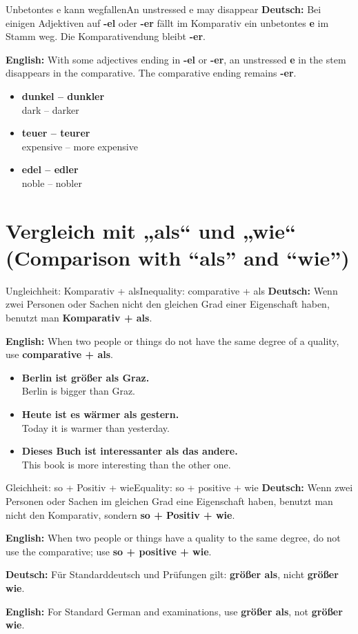\documentclass[a4paper,11pt]{article}
\newcommand{\GermanText}[1]{\textbf{Deutsch: }#1\par}
\newcommand{\EnglishText}[1]{{\small\color{SoftGray}\textbf{English: }#1\par}}
\newcommand{\ExampleItem}[2]{\item \textbf{#1}\\{\small\color{SoftGray}#2}}
\begin{document}
      \begin{grammarentry}{Unbetontes e kann wegfallen}{An unstressed e may disappear}
         \GermanText{Bei einigen Adjektiven auf \textbf{-el} oder \textbf{-er} fällt im Komparativ ein unbetontes \textbf{e} im Stamm weg. Die Komparativendung bleibt \textbf{-er}.}
         \EnglishText{With some adjectives ending in \textbf{-el} or \textbf{-er}, an unstressed \textbf{e} in the stem disappears in the comparative. The comparative ending remains \textbf{-er}.}
      \end{grammarentry}

      \begin{exbox}
         \begin{itemize}
            \ExampleItem{dunkel -- dunkler}{dark -- darker}
            \ExampleItem{teuer -- teurer}{expensive -- more expensive}
            \ExampleItem{edel -- edler}{noble -- nobler}
         \end{itemize}
      \end{exbox}

   \section{Vergleich mit „als“ und „wie“ \textnormal{(Comparison with “als” and “wie”)}}

      \begin{grammarentry}{Ungleichheit: Komparativ + als}{Inequality: comparative + als}
         \GermanText{Wenn zwei Personen oder Sachen nicht den gleichen Grad einer Eigenschaft haben, benutzt man \textbf{Komparativ + als}.}
         \EnglishText{When two people or things do not have the same degree of a quality, use \textbf{comparative + als}.}
      \end{grammarentry}

      \begin{exbox}
         \begin{itemize}
            \ExampleItem{Berlin ist größer als Graz.}{Berlin is bigger than Graz.}
            \ExampleItem{Heute ist es wärmer als gestern.}{Today it is warmer than yesterday.}
            \ExampleItem{Dieses Buch ist interessanter als das andere.}{This book is more interesting than the other one.}
         \end{itemize}
      \end{exbox}

      \begin{grammarentry}{Gleichheit: so + Positiv + wie}{Equality: so + positive + wie}
         \GermanText{Wenn zwei Personen oder Sachen im gleichen Grad eine Eigenschaft haben, benutzt man nicht den Komparativ, sondern \textbf{so + Positiv + wie}.}
         \EnglishText{When two people or things have a quality to the same degree, do not use the comparative; use \textbf{so + positive + wie}.}

         \GermanText{Für Standarddeutsch und Prüfungen gilt: \textbf{größer als}, nicht \textbf{größer wie}.}
         \EnglishText{For Standard German and examinations, use \textbf{größer als}, not \textbf{größer wie}.}
      \end{grammarentry}
\end{document}
